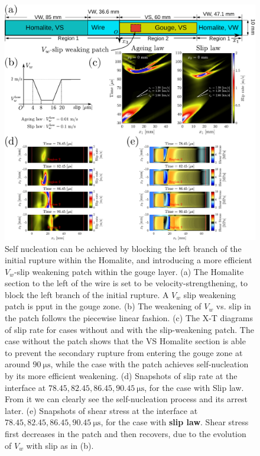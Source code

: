 \documentclass[final,a4paper]{elsarticle}
\begin{document}
\begin{figure}[htbp]
    \centering
    \includegraphics[width=1.0\textwidth]{figures/SL Patch_AgeingSlipCombined.pdf}
    \caption{Self nucleation can be achieved by blocking the left branch of the initial rupture within the Homalite, and introducing a more efficient $V_w$-slip weakening patch within the gouge layer. 
    (a) The Homalite section to the left of the wire is set to be velocity-strengthening, to block the left branch of the initial rupture. A $V_w$ slip weakening patch is pput in the gouge zone. 
    (b) The weakening of $V_w$ vs. slip in the patch follows the piecewise linear fashion.
    (c) The X-T diagrams of slip rate for cases without and with the slip-weakening patch. 
    The case without the patch shows that the VS Homalite section is able to prevent the secondary rupture from entering the gouge zone at around $90\ \mathrm{\mu s}$, 
    while the case with the patch achieves self-nucleation by its more efficient weakening. 
    (d) Snapshots of slip rate at the interface at $78.45, 82.45, 86.45, 90.45\ \mathrm{\mu s}$, 
    for the case with Slip law. 
    From it we can clearly see the self-nucleation process and its arrest later. 
    (e) Snapshots of shear stress at the interface at $78.45, 82.45, 86.45, 90.45\ \mathrm{\mu s}$, 
    for the case with \textbf{slip law}. 
    Shear stress first decreases in the patch and then recovers, due to the evolution of $V_w$ with slip as in (b).}
    \label{fig:SLPatchCombined}
\end{figure}
\end{document}
